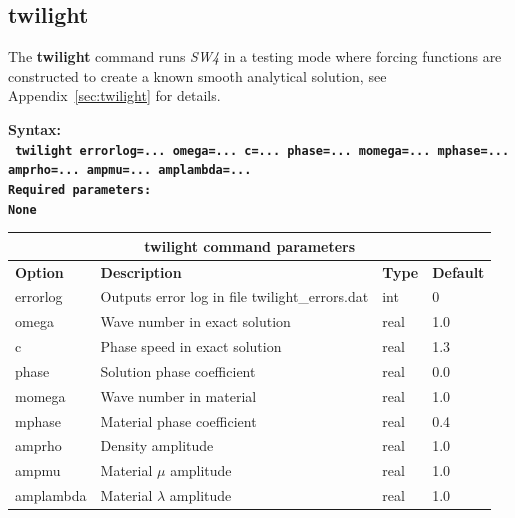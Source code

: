 \documentclass[11pt]{report}
\begin{document}
{\subsection{twilight}
\label{keyword:twilight}
The {\bf twilight} command runs \emph{SW4} in a testing mode where forcing functions are constructed to
create a known smooth analytical solution, see Appendix~\ref{sec:twilight} for details.
\begin{flushleft}
	\bf
	Syntax:\\
	\tt
	twilight errorlog=... omega=... c=... phase=... momega=... mphase=... amprho=... ampmu=... amplambda=...
	\\
	\bf Required parameters:\\
	\rm
	None
\end{flushleft}
\begin{center}
	\begin{tabular}{|l|p{8cm}|l|l|} \hline
		\multicolumn{4}{|c|}{\bf twilight command parameters}                                   \\ \hline
		\bf{Option} & \bf{Description}                               & \bf{Type} & \bf{Default} \\ \hline \hline
		errorlog    & Outputs error log in file twilight\_errors.dat & int       & 0            \\ \hline
		omega       & Wave number in exact solution                  & real      & 1.0          \\ \hline
		c           & Phase speed in exact solution                  & real      & 1.3          \\ \hline
		phase       & Solution phase coefficient                     & real      & 0.0          \\ \hline
		momega      & Wave number in material                        & real      & 1.0          \\ \hline
		mphase      & Material phase coefficient                     & real      & 0.4          \\ \hline
		amprho      & Density amplitude                              & real      & 1.0          \\ \hline
		ampmu       & Material $\mu$ amplitude                       & real      & 1.0          \\ \hline
		amplambda   & Material $\lambda$ amplitude                   & real      & 1.0          \\ \hline
	\end{tabular}
\end{center}

}
\end{document}
